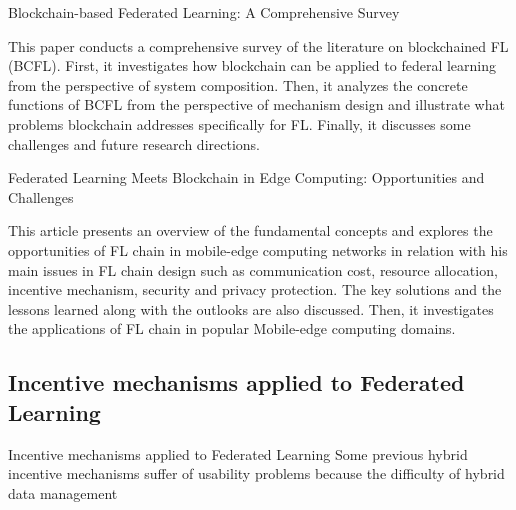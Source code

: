 \begin{frame}
Blockchain-based Federated Learning: A Comprehensive Survey\cite{Comprehensive_survey}


This paper conducts a comprehensive survey of the literature on blockchained FL (BCFL). First, it investigates how blockchain can be applied to federal learning from the perspective of system composition. Then, it analyzes the concrete functions of BCFL from the perspective of mechanism design and illustrate what problems blockchain addresses specifically for FL. Finally, it discusses some challenges and future research directions.
\end{frame}

\begin{frame}
Federated Learning Meets Blockchain in Edge Computing: Opportunities and Challenges\cite{nguyen_federated_2021}


This article presents an overview of the fundamental concepts and explores the opportunities of FL chain in mobile-edge computing networks in relation with his main issues in FL chain design such as communication cost, resource allocation, incentive mechanism, security and privacy protection. The key solutions and the lessons learned along with the outlooks are also discussed. Then, it investigates the applications of FL chain in popular Mobile-edge computing domains.
\end{frame}
\subsection{Incentive mechanisms applied to Federated Learning}

\begin{frame}{Incentive mechanisms applied to Federated Learning}
     Some previous hybrid incentive mechanisms\cite{paper52} suffer of usability problems because the difficulty of hybrid data management
\end{frame}

